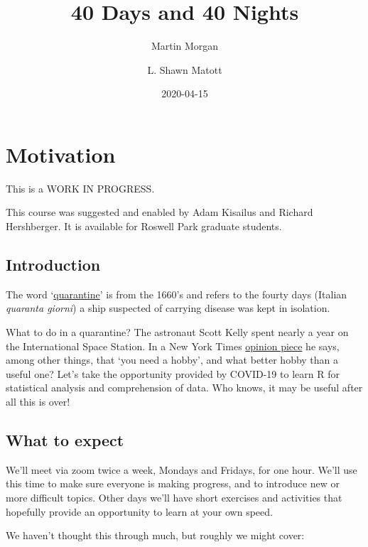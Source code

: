 \documentclass[]{book}
\title{40 Days and 40 Nights}
\author{Martin Morgan \and L. Shawn Matott}
\date{2020-04-15}
\begin{document}
\maketitle

{
\setcounter{tocdepth}{1}
\tableofcontents
}
\hypertarget{motivation}{%
\chapter*{Motivation}\label{motivation}}

This is a WORK IN PROGRESS.

This course was suggested and enabled by Adam Kisailus and Richard Hershberger. It is available for Roswell Park graduate students.

\hypertarget{introduction}{%
\section*{Introduction}\label{introduction}}

The word `\href{https://www.etymonline.com/word/quarantine}{quarantine}' is from the 1660's and refers to the fourty days (Italian \emph{quaranta giorni}) a ship suspected of carrying disease was kept in isolation.

What to do in a quarantine? The astronaut Scott Kelly spent nearly a year on the International Space Station. In a New York Times \href{https://www.nytimes.com/2020/03/21/opinion/scott-kelly-coronavirus-isolation.html}{opinion piece} he says, among other things, that `you need a hobby', and what better hobby than a useful one? Let's take the opportunity provided by COVID-19 to learn R for statistical analysis and comprehension of data. Who knows, it may be useful after all this is over!

\hypertarget{what-to-expect}{%
\section*{What to expect}\label{what-to-expect}}

We'll meet via zoom twice a week, Mondays and Fridays, for one hour. We'll use this time to make sure everyone is making progress, and to introduce new or more difficult topics. Other days we'll have short exercises and activities that hopefully provide an opportunity to learn at your own speed.

We haven't thought this through much, but roughly we might cover:
\end{document}
